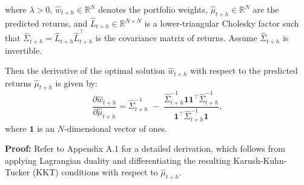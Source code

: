where $\lambda > 0$, $\hat{w}_{t+h} \in \mathbb{R}^N$ denotes the portfolio weights, $\hat{\mu}_{t+h} \in \mathbb{R}^N$ are the predicted returns, and $\hat{L}_{t+h} \in \mathbb{R}^{N \times N}$ is a lower-triangular Cholesky factor such that $\hat{\Sigma}_{t+h} = \hat{L}_{t+h}\hat{L}_{t+h}^{\top}$ is the covariance matrix of returns. Assume $\hat{\Sigma}_{t+h}$ is invertible.

Then the derivative of the optimal solution $\hat{w}_{t+h}$ with respect to the predicted returns $\hat{\mu}_{t+h}$ is given by:
\begin{equation}
    \frac{\partial \hat{w}_{t+h}}{\partial \hat{\mu}_{t+h}} = \hat{\Sigma}_{t+h}^{-1} \;-\; \frac{\hat{\Sigma}_{t+h}^{-1}\mathbf{1}\mathbf{1}^{\top}\hat{\Sigma}_{t+h}^{-1}}{\mathbf{1}^{\top}\hat{\Sigma}_{t+h}^{-1}\mathbf{1}},
\end{equation}
where $\mathbf{1}$ is an $N$-dimensional vector of ones.

\textbf{Proof: } Refer to Appendix A.1 for a detailed derivation, which follows from applying Lagrangian duality and differentiating the resulting Karush-Kuhn-Tucker (KKT) conditions with respect to $\hat{\mu}_{t+h}$.



